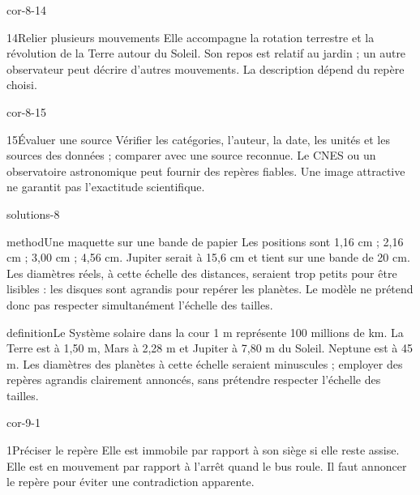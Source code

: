 \documentclass[12pt,twoside,openany]{book}
\begin{document}
\begin{blocLivre}{cor-8-14}
\begin{corrige}{14}{Relier plusieurs mouvements}
Elle accompagne la rotation terrestre et la révolution de la Terre autour du Soleil. Son repos est relatif au jardin ; un autre observateur peut décrire d’autres mouvements. La description dépend du repère choisi.\par
\end{corrige}\end{blocLivre}
\begin{blocLivre}{cor-8-15}
\begin{corrige}{15}{Évaluer une source}
Vérifier les catégories, l’auteur, la date, les unités et les sources des données ; comparer avec une source reconnue. Le CNES ou un observatoire astronomique peut fournir des repères fiables. Une image attractive ne garantit pas l’exactitude scientifique.\par
\end{corrige}\end{blocLivre}
\label{solutions-8}
\begin{pcFiche}{solutions-8}
\begin{pcEncadre}{method}{Une maquette sur une bande de papier}
Les positions sont 1,16 cm ; 2,16 cm ; 3,00 cm ; 4,56 cm. Jupiter serait à 15,6 cm et tient sur une bande de 20 cm. Les diamètres réels, à cette échelle des distances, seraient trop petits pour être lisibles : les disques sont agrandis pour repérer les planètes. Le modèle ne prétend donc pas respecter simultanément l’échelle des tailles.\par
\end{pcEncadre}
\label{defi-cor-8}
\begin{pcEncadre}{definition}{Le Système solaire dans la cour}
1 m représente 100 millions de km. La Terre est à 1,50 m, Mars à 2,28 m et Jupiter à 7,80 m du Soleil. Neptune est à 45 m. Les diamètres des planètes à cette échelle seraient minuscules ; employer des repères agrandis clairement annoncés, sans prétendre respecter l’échelle des tailles.\par
\end{pcEncadre}
\end{pcFiche}
\clearpage{}
\begin{blocLivre}{cor-9-1}
\begin{corrige}{1}{Préciser le repère}
Elle est immobile par rapport à son siège si elle reste assise. Elle est en mouvement par rapport à l’arrêt quand le bus roule. Il faut annoncer le repère pour éviter une contradiction apparente.\par
\end{corrige}\end{blocLivre}
\end{document}
